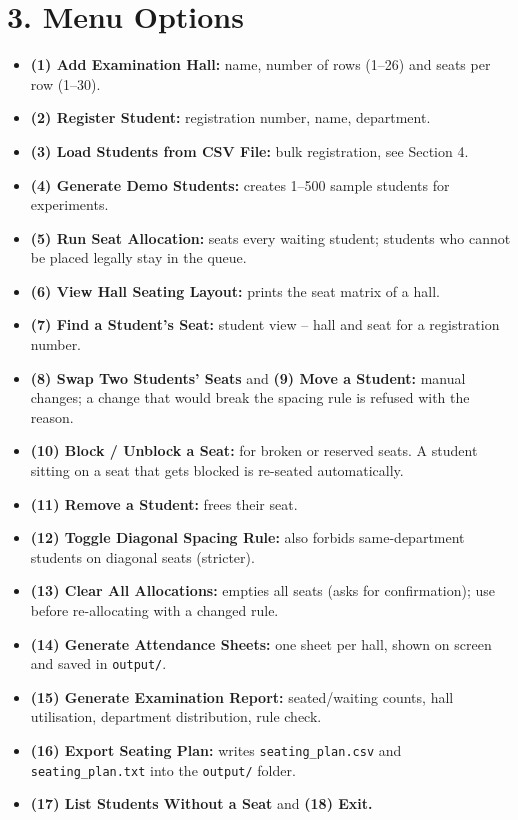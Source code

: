 \documentclass[a4paper,12pt]{article}
\begin{document}
\section*{3. Menu Options}
\begin{itemize}
    \item \textbf{(1) Add Examination Hall:} name, number of rows (1--26) and seats per row (1--30).
    \item \textbf{(2) Register Student:} registration number, name, department.
    \item \textbf{(3) Load Students from CSV File:} bulk registration, see Section 4.
    \item \textbf{(4) Generate Demo Students:} creates 1--500 sample students for experiments.
    \item \textbf{(5) Run Seat Allocation:} seats every waiting student; students who cannot be placed legally stay in the queue.
    \item \textbf{(6) View Hall Seating Layout:} prints the seat matrix of a hall.
    \item \textbf{(7) Find a Student's Seat:} student view -- hall and seat for a registration number.
    \item \textbf{(8) Swap Two Students' Seats} and \textbf{(9) Move a Student:} manual changes; a change that would break the spacing rule is refused with the reason.
    \item \textbf{(10) Block / Unblock a Seat:} for broken or reserved seats. A student sitting on a seat that gets blocked is re-seated automatically.
    \item \textbf{(11) Remove a Student:} frees their seat.
    \item \textbf{(12) Toggle Diagonal Spacing Rule:} also forbids same-department students on diagonal seats (stricter).
    \item \textbf{(13) Clear All Allocations:} empties all seats (asks for confirmation); use before re-allocating with a changed rule.
    \item \textbf{(14) Generate Attendance Sheets:} one sheet per hall, shown on screen and saved in \texttt{output/}.
    \item \textbf{(15) Generate Examination Report:} seated/waiting counts, hall utilisation, department distribution, rule check.
    \item \textbf{(16) Export Seating Plan:} writes \texttt{seating\_plan.csv} and \texttt{seating\_plan.txt} into the \texttt{output/} folder.
    \item \textbf{(17) List Students Without a Seat} and \textbf{(18) Exit.}
\end{itemize}
\end{document}

